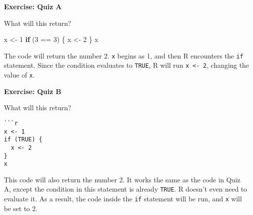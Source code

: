 \documentclass[
  letterpaper,
  DIV=11,
  numbers=noendperiod]{scrbook}
\newenvironment{Shaded}{\begin{snugshade}}{\end{snugshade}}
\newcommand{\ControlFlowTok}[1]{\textcolor[rgb]{0.00,0.23,0.31}{\textbf{#1}}}
\newcommand{\DecValTok}[1]{\textcolor[rgb]{0.68,0.00,0.00}{#1}}
\newcommand{\NormalTok}[1]{\textcolor[rgb]{0.00,0.23,0.31}{#1}}
\newcommand{\OtherTok}[1]{\textcolor[rgb]{0.00,0.23,0.31}{#1}}
\newcommand{\SpecialCharTok}[1]{\textcolor[rgb]{0.37,0.37,0.37}{#1}}
\begin{document}
\begin{tcolorbox}[enhanced jigsaw, left=2mm, breakable, colback=white, colframe=quarto-callout-color-frame, leftrule=.75mm, bottomrule=.15mm, arc=.35mm, opacityback=0, rightrule=.15mm, toprule=.15mm]

\vspace{-3mm}\textbf{Exercise: Quiz A}\vspace{3mm}

What will this return?

\begin{Shaded}
\begin{Highlighting}[]
\NormalTok{x }\OtherTok{\textless{}{-}} \DecValTok{1}
\ControlFlowTok{if}\NormalTok{ (}\DecValTok{3} \SpecialCharTok{==} \DecValTok{3}\NormalTok{) \{}
\NormalTok{  x }\OtherTok{\textless{}{-}} \DecValTok{2}
\NormalTok{\}}
\NormalTok{x}
\end{Highlighting}
\end{Shaded}

\end{tcolorbox}

The code will return the number 2. \texttt{x} begins as 1, and then R
encounters the \texttt{if} statement. Since the condition evaluates to
\texttt{TRUE}, R will run \texttt{x\ \textless{}-\ 2}, changing the
value of \texttt{x}.

\begin{tcolorbox}[enhanced jigsaw, left=2mm, breakable, colback=white, colframe=quarto-callout-color-frame, leftrule=.75mm, bottomrule=.15mm, arc=.35mm, opacityback=0, rightrule=.15mm, toprule=.15mm]

\vspace{-3mm}\textbf{Exercise: Quiz B}\vspace{3mm}

What will this return?

\begin{verbatim}
```r
x <- 1
if (TRUE) {
  x <- 2
}
x
\end{verbatim}

\end{tcolorbox}

This code will also return the number 2. It works the same as the code
in Quiz A, except the condition in this statement is already
\texttt{TRUE}. R doesn't even need to evaluate it. As a result, the code
inside the \texttt{if} statement will be run, and \texttt{x} will be set
to 2.
\end{document}
